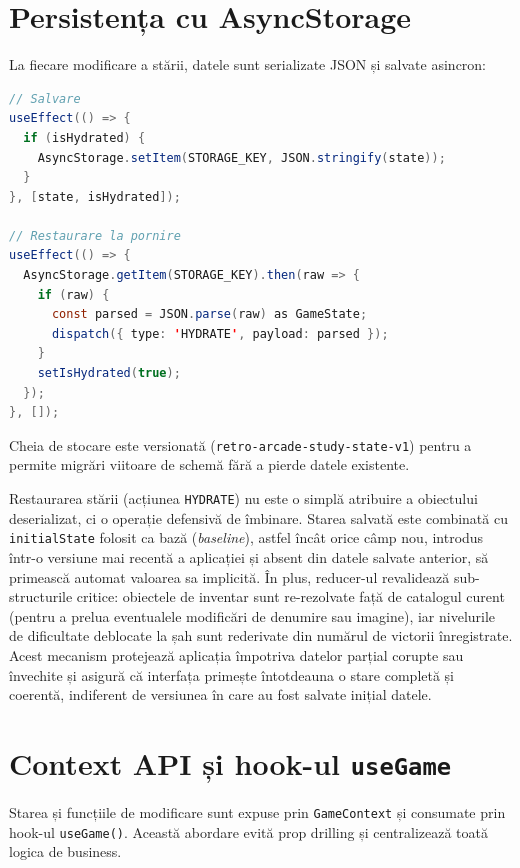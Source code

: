 \documentclass[12pt, a4paper, twoside]{report}
\numberwithin{equation}{section}
\begin{document}
\section{Persistența cu AsyncStorage}

La fiecare modificare a stării, datele sunt serializate JSON și salvate asincron:

\begin{lstlisting}[language=Java, caption={Salvarea și restaurarea stării}]
// Salvare
useEffect(() => {
  if (isHydrated) {
    AsyncStorage.setItem(STORAGE_KEY, JSON.stringify(state));
  }
}, [state, isHydrated]);

// Restaurare la pornire
useEffect(() => {
  AsyncStorage.getItem(STORAGE_KEY).then(raw => {
    if (raw) {
      const parsed = JSON.parse(raw) as GameState;
      dispatch({ type: 'HYDRATE', payload: parsed });
    }
    setIsHydrated(true);
  });
}, []);
\end{lstlisting}

Cheia de stocare este versionată (\texttt{retro-arcade-study-state-v1}) pentru a permite
migrări viitoare de schemă fără a pierde datele existente.

Restaurarea stării (acțiunea \texttt{HYDRATE}) nu este o simplă atribuire a obiectului
deserializat, ci o operație defensivă de îmbinare. Starea salvată este combinată cu
\texttt{initialState} folosit ca bază (\textit{baseline}), astfel încât orice câmp nou,
introdus într-o versiune mai recentă a aplicației și absent din datele salvate anterior, să
primească automat valoarea sa implicită. În plus, reducer-ul revalidează sub-structurile
critice: obiectele de inventar sunt re-rezolvate față de catalogul curent (pentru a prelua
eventualele modificări de denumire sau imagine), iar nivelurile de dificultate deblocate la
șah sunt rederivate din numărul de victorii înregistrate. Acest mecanism protejează
aplicația împotriva datelor parțial corupte sau învechite și asigură că interfața primește
întotdeauna o stare completă și coerentă, indiferent de versiunea în care au fost salvate
inițial datele.

\section{Context API și hook-ul \texttt{useGame}}

Starea și funcțiile de modificare sunt expuse prin \texttt{GameContext} și consumate prin
hook-ul \texttt{useGame()}. Această abordare evită prop drilling și centralizează toată
logica de business.
\end{document}
